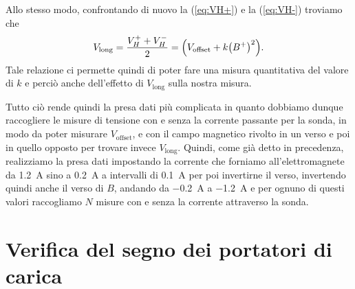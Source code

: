 \documentclass[
    prl,
    reprint, 
    superscriptaddress, 
    altaffilletter, 
    amsmath, 
    amssymb, 
    a4paper,
    varvw]{revtex4-2}
\begin{document}
Allo stesso modo, confrontando di nuovo la (\ref{eq:VH+}) e la (\ref{eq:VH-}) troviamo che \begin{equation}
    V_\text{long} = \frac{V_H^+ + V_H^-}{2}= \qty(V_\text{offset} + k\qty(B^+)^2).
\end{equation}
Tale relazione ci permette quindi di poter fare una misura quantitativa del valore di $k$ e perciò anche dell'effetto di $V_\text{long}$ sulla nostra misura. 

Tutto ciò rende quindi la presa dati più complicata in quanto dobbiamo dunque raccogliere le misure di tensione con e senza la corrente passante per la sonda, in modo da poter misurare $V_\text{offset}$, e con il campo magnetico rivolto in un verso e poi in quello opposto per trovare invece $V_\text{long}$. Quindi, come già detto in precedenza, realizziamo la presa dati impostando la corrente che forniamo all'elettromagnete da \SI{1.2}{\ampere} sino a \SI{0.2}{\ampere} a intervalli di \SI{0.1}{\ampere} per poi invertirne il verso, invertendo quindi anche il verso di $B$, andando da \SI{-0.2}{\ampere} a \SI{-1.2}{\ampere} e per ognuno di questi valori raccogliamo $N$ misure con e senza la corrente attraverso la sonda.


\section{Verifica del segno dei portatori di carica}
\end{document}
